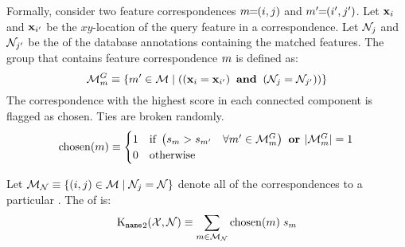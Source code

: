             \newcommand{\MatchesGroup}{\Matches^{G}}

            Formally, consider two feature correspondences
              $m\mkern-6mu=\mkern-6mu(i, j)$ and $m'\mkern-6mu=\mkern-6mu(i', j')$.
            Let $\mathbf{x}_{i}$ and $\mathbf{x}_{i'}$ be the $xy$-location of
              the query feature in a correspondence.
            Let $\mathcal{N}_{j}$ and $\mathcal{N}_{j'}$ be the \name{} of the
              database annotations containing the matched features.
            The group that contains feature correspondence $m$ is
              defined as:
            \begin{equation}
                \MatchesGroup_{\mI} \eqv \curly{\mII \in \Matches  \where
                \paren{
                    \paren{\pt_{\iI} \eq \pt_{\iII}} \AND 
                    \paren{\nid_{\jI} \eq \nid_{\jII}}
                }
            }
            \end{equation}
            The correspondence with the highest score in each connected
              component is flagged as chosen.
            Ties are broken randomly.
            \begin{equation}
                \ischosen(\mI) \eqv 
                \bincase{
                \paren{
                    \fs_{\mI} > \fs_{\mII} 
                    \quad \forall \mII  \in \MatchesGroup_{\mI}
                } 
                \OR
                \card{\MatchesGroup_{\mI}} \eq 1
                }
            \end{equation}

            Let $\mathcal{M}_{\mathcal{N}} \equiv \{(i, j) \in \mathcal{M} \mid
              \mathcal{N}_j = \mathcal{N}\}$ denote all of the correspondences to a particular
              \name{}.
            The \nscore{} of \aan{\name{}} is:
            \begin{equation}
                \operatorname{K_{\tt name}}_2(\mathcal{X}, \mathcal{N}) 
                \equiv 
                \sum_{m \in \mathcal{M}_{\mathcal{N}}} \operatorname{chosen}(m) \; s_m
            \end{equation}

            \namematch{}
